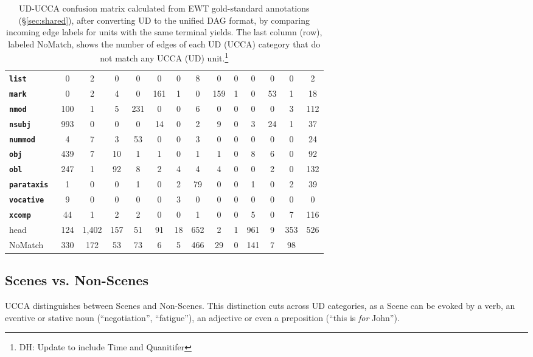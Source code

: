 \documentclass[11pt,a4paper]{article}
\newcommand{\daniel}[1]{\footnote{\color{blue}DH: #1}}
\begin{document}
\begin{table}[t]
\begin{tabular}{l|cccccccccccc|c}
\bf \tt \tiny list & 0 & 2 & 0 & 0 & 0 & 0 & 8 & 0 & 0 & 0 & 0 & 0 & 2 \\
\bf \tt \tiny mark & 0 & 2 & 4 & 0 & 161 & 1 & 0 & 159 & 1 & 0 & 53 & 1 & 18 \\
\bf \tt \tiny nmod & 100 & 1 & 5 & 231 & 0 & 0 & 6 & 0 & 0 & 0 & 0 & 3 & 112 \\
\bf \tt \tiny nsubj & 993 & 0 & 0 & 0 & 14 & 0 & 2 & 9 & 0 & 3 & 24 & 1 & 37 \\
\bf \tt \tiny nummod & 4 & 7 & 3 & 53 & 0 & 0 & 3 & 0 & 0 & 0 & 0 & 0 & 24 \\
\bf \tt \tiny obj & 439 & 7 & 10 & 1 & 1 & 0 & 1 & 1 & 0 & 8 & 6 & 0 & 92 \\
\bf \tt \tiny obl & 247 & 1 & 92 & 8 & 2 & 4 & 4 & 4 & 0 & 0 & 2 & 0 & 132 \\
\bf \tt \tiny parataxis & 1 & 0 & 0 & 1 & 0 & 2 & 79 & 0 & 0 & 1 & 0 & 2 & 39 \\
\bf \tt \tiny vocative & 9 & 0 & 0 & 0 & 0 & 3 & 0 & 0 & 0 & 0 & 0 & 0 & 0 \\
\bf \tt \tiny xcomp & 44 & 1 & 2 & 2 & 0 & 0 & 1 & 0 & 0 & 5 & 0 & 7 & 116 \\
\hline
head & 124 & 1,402 & 157 & 51 & 91 & 18 & 652 & 2 & 1 & 961 & 9 & 353 & 526 \\
{\sc NoMatch} & 330 & 172 & 53 & 73 & 6 & 5 & 466 & 29 & 0 & 141 & 7 & 98
\end{tabular}
\caption{UD-UCCA confusion matrix calculated from EWT
gold-standard annotations (\S\ref{sec:shared}),
after converting UD to the unified DAG format,
by comparing incoming edge labels for units with the same terminal yields.
The last column (row), labeled {\sc NoMatch}, shows the number of edges of each UD (UCCA) category
that do not match any UCCA (UD) unit.\daniel{Update to include Time and Quanitifer}
\label{tab:confusion_matrix}}
\end{table}


\subsection{Scenes vs. Non-Scenes}\label{sec:s}

UCCA distinguishes between Scenes and Non-Scenes. 
This distinction cuts across UD categories,
as a Scene can be evoked by a verb, an eventive or stative
noun (``negotiation'', ``fatigue''),
an adjective or even a preposition (``this is \textit{for} John'').
\end{document}
